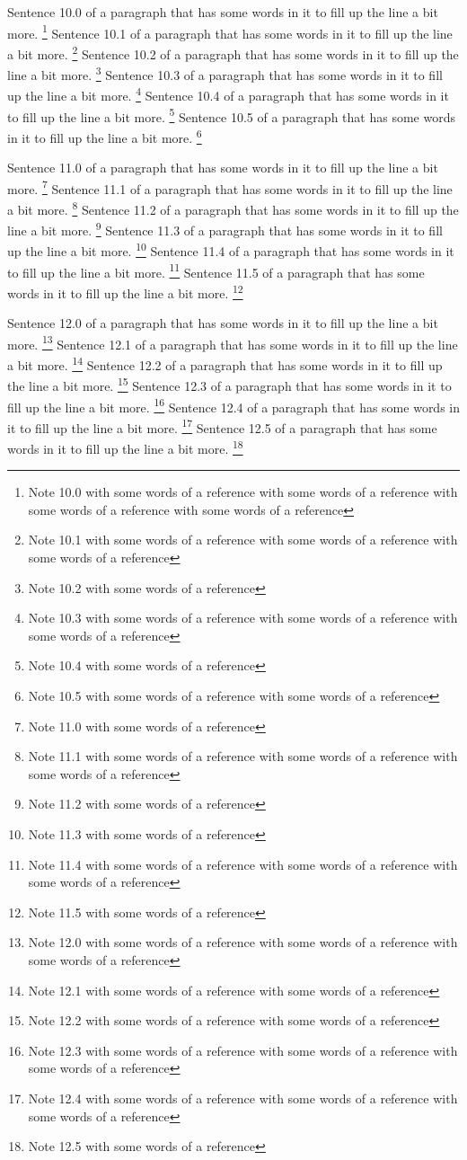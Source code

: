 Sentence 10.0 of a paragraph that has some words in it to fill up the line a bit more. \footnote{Note 10.0 with some words of a reference with some words of a reference with some words of a reference with some words of a reference} Sentence 10.1 of a paragraph that has some words in it to fill up the line a bit more. \footnote{Note 10.1 with some words of a reference with some words of a reference with some words of a reference} Sentence 10.2 of a paragraph that has some words in it to fill up the line a bit more. \footnote{Note 10.2 with some words of a reference} Sentence 10.3 of a paragraph that has some words in it to fill up the line a bit more. \footnote{Note 10.3 with some words of a reference with some words of a reference with some words of a reference} Sentence 10.4 of a paragraph that has some words in it to fill up the line a bit more. \footnote{Note 10.4 with some words of a reference} Sentence 10.5 of a paragraph that has some words in it to fill up the line a bit more. \footnote{Note 10.5 with some words of a reference with some words of a reference}

Sentence 11.0 of a paragraph that has some words in it to fill up the line a bit more. \footnote{Note 11.0 with some words of a reference} Sentence 11.1 of a paragraph that has some words in it to fill up the line a bit more. \footnote{Note 11.1 with some words of a reference with some words of a reference with some words of a reference} Sentence 11.2 of a paragraph that has some words in it to fill up the line a bit more. \footnote{Note 11.2 with some words of a reference} Sentence 11.3 of a paragraph that has some words in it to fill up the line a bit more. \footnote{Note 11.3 with some words of a reference} Sentence 11.4 of a paragraph that has some words in it to fill up the line a bit more. \footnote{Note 11.4 with some words of a reference with some words of a reference with some words of a reference} Sentence 11.5 of a paragraph that has some words in it to fill up the line a bit more. \footnote{Note 11.5 with some words of a reference}

Sentence 12.0 of a paragraph that has some words in it to fill up the line a bit more. \footnote{Note 12.0 with some words of a reference with some words of a reference with some words of a reference} Sentence 12.1 of a paragraph that has some words in it to fill up the line a bit more. \footnote{Note 12.1 with some words of a reference with some words of a reference} Sentence 12.2 of a paragraph that has some words in it to fill up the line a bit more. \footnote{Note 12.2 with some words of a reference with some words of a reference} Sentence 12.3 of a paragraph that has some words in it to fill up the line a bit more. \footnote{Note 12.3 with some words of a reference with some words of a reference with some words of a reference} Sentence 12.4 of a paragraph that has some words in it to fill up the line a bit more. \footnote{Note 12.4 with some words of a reference with some words of a reference with some words of a reference} Sentence 12.5 of a paragraph that has some words in it to fill up the line a bit more. \footnote{Note 12.5 with some words of a reference}

